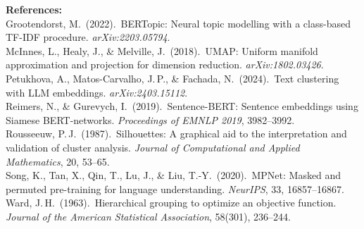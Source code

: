 \documentclass[11pt, a4paper]{article}
\begin{document}
\vspace{14pt}
\noindent\textcolor{midblue}{\small\textbf{References:}\\[3pt]
Grootendorst, M.\ (2022).\ BERTopic: Neural topic modelling with a class-based
TF-IDF procedure. \textit{arXiv:2203.05794}.\\[3pt]
McInnes, L., Healy, J., \& Melville, J.\ (2018).\ UMAP: Uniform manifold
approximation and projection for dimension reduction.
\textit{arXiv:1802.03426}.\\[3pt]
Petukhova, A., Matos-Carvalho, J.\,P., \& Fachada, N.\ (2024).\ Text clustering
with LLM embeddings. \textit{arXiv:2403.15112}.\\[3pt]
Reimers, N., \& Gurevych, I.\ (2019).\ Sentence-BERT: Sentence embeddings using
Siamese BERT-networks. \textit{Proceedings of EMNLP 2019}, 3982--3992.\\[3pt]
Rousseeuw, P.\,J.\ (1987).\ Silhouettes: A graphical aid to the interpretation
and validation of cluster analysis. \textit{Journal of Computational and Applied
Mathematics}, 20, 53--65.\\[3pt]
Song, K., Tan, X., Qin, T., Lu, J., \& Liu, T.-Y.\ (2020).\ MPNet: Masked and
permuted pre-training for language understanding.
\textit{NeurIPS}, 33, 16857--16867.\\[3pt]
Ward, J.\,H.\ (1963).\ Hierarchical grouping to optimize an objective function.
\textit{Journal of the American Statistical Association}, 58(301), 236--244.}
\end{document}
